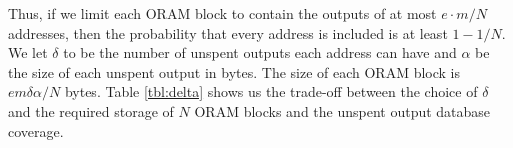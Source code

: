 \begin{newtext}
Thus, if we limit each ORAM block to contain the outputs of at most $e\cdot m/N$ addresses, then the probability that every address is included is at least $1-1/N$.
We let $\delta$ to be the number of unspent outputs each address can have and $\alpha$ be the size of each unspent output in bytes. The size of each ORAM block is  $e m  \delta \alpha/N$ bytes. 
Table \ref{tbl:delta} shows us the trade-off between the choice of $\delta$ and the required storage of $N$ ORAM blocks and the unspent output database coverage.
\end{newtext}
\\
\begin{table}[!h]
\centering
{}%
\caption{Trade-off}
\label{tbl:delta}
\end{table}
